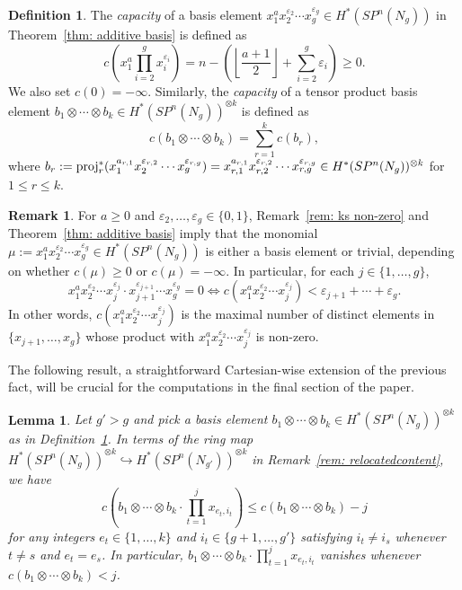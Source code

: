 \documentclass[amscd,amssymb,verbatim,10pt]{amsart}
\numberwithin{equation}{section}
\theoremstyle{plain}
\newtheorem{lemma}[thm]{Lemma}
\theoremstyle{definition}
\newtheorem{definition}[thm]{Definition}
\newtheorem{remark}[thm]{Remark}
\DeclareMathOperator{\proj}{{\textup{proj}}}
\begin{document}
\begin{definition}\label{def: capacity}
The \emph{capacity} of a basis element $x_1^ax_2^{\varepsilon_2}\cdots x_g^{\varepsilon_g}\in H^*(SP^n(N_g))$ in Theorem~\ref{thm: additive basis} is defined as
\[c\left(x_1^a\prod_{i=2}^gx_i^{\varepsilon_i}\right)=n-\left(\left\lfloor\frac{a+1}{2}\right\rfloor+\sum_{i=2}^g\varepsilon_i\right)\ge 0.
\]
We also set $c(0)=-\infty$. Similarly, the \emph{capacity} of a tensor product basis element $b_1\otimes\cdots\otimes b_k\in H^*(SP^n(N_g))^{\otimes k}$ is defined as
\[
c\left(b_1\otimes\cdots\otimes b_k\right)=\sum_{r=1}^kc(b_{r}),
\]
where $b_r:=\proj_r^*(x_{1}^{a_{r,1}}x_{2}^{\varepsilon_{r,2}}\cdots x_{g}^{\varepsilon_{r,g}})=x_{r,1}^{a_{r,1}}x_{r,2}^{\varepsilon_{r,2}}\cdots x_{r,g}^{\varepsilon_{r,g}}\in H^*(SP^n(N_g))^{\otimes k}$ for $1\le r\le k$.
\end{definition}

\begin{remark}\label{motivaciondelacapacidad}
For $a\geq0$ and $\varepsilon_2,\ldots,\varepsilon_g\in\{0,1\}$, Remark~\ref{rem: ks non-zero} and Theorem~\ref{thm: additive basis} imply that the monomial $\mu:=x_1^ax_2^{\varepsilon_2}\cdots x_g^{\varepsilon_g}\in H^*(SP^n(N_g))$ is either a basis element or trivial, depending on whether $c(\mu)\geq0$ or $c(\mu)=-\infty$. In particular, for each $j\in\{1,\ldots,g\}$, $$x_1^ax_2^{\varepsilon_2}\cdots x_j^{\varepsilon_j}\cdot x_{j+1}^{\varepsilon_{j+1}} \cdots x_g^{\varepsilon_g}=0 \iff c(x_1^ax_2^{\varepsilon_2}\cdots x_j^{\varepsilon_j})<\varepsilon_{j+1}+\cdots+\varepsilon_g.$$ In other words, $c(x_1^ax_2^{\varepsilon_2}\cdots x_j^{\varepsilon_j})$ is the maximal number of distinct elements in $\{x_{j+1},\ldots,x_g\}$ whose product with $x_1^ax_2^{\varepsilon_2}\cdots x_j^{\varepsilon_j}$ is non-zero. 
\end{remark}

The following result, a straightforward Cartesian-wise extension of the previous fact, will be crucial for the computations in the final section of the paper.

\begin{lemma}\label{lem: tool for capacity}
Let $g'>g$ and pick a basis element $b_1\otimes \cdots\otimes b_k\in H^*(SP^n(N_g))^{\otimes k}$ as in Definition~\ref{def: capacity}. In terms of the ring map $H^*(SP^n(N_g))^{\otimes k}\hookrightarrow H^*(SP^n(N_{g'}))^{\otimes k}$ in Remark~\ref{rem: relocatedcontent}, we have
\[
c\left(b_1\otimes\cdots\otimes b_k\cdot\prod_{t=1}^jx_{e_t,i_t}\right)\le c\left(b_1\otimes\cdots\otimes b_k\right)-j
\]
for any integers $e_t\in\{1,\ldots,k\}$ and $i_t\in\{g+1,\ldots,g'\}$ satisfying $i_t\ne i_s$ whenever $t\ne s$ and $e_t=e_s$. In particular, $b_1\otimes\cdots\otimes b_k \cdot   \prod_{t=1}^jx_{e_t,i_t}$ vanishes whenever $c(b_1\otimes\cdots\otimes b_k)<j$.
\end{lemma}
\end{document}
